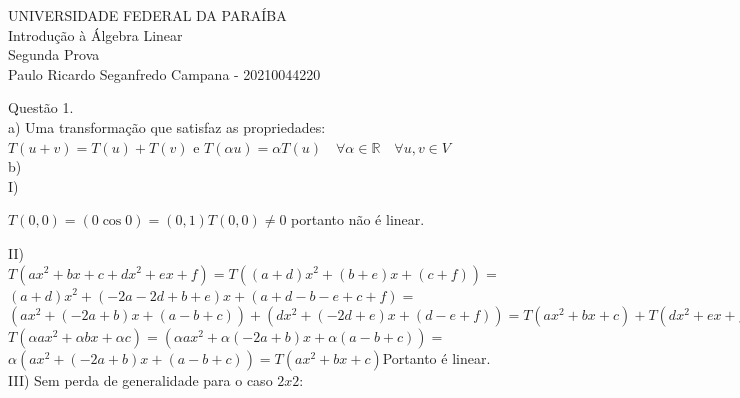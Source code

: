 \documentclass[12pt]{article}
\begin{document}
\begin{center}
	UNIVERSIDADE FEDERAL DA PARAÍBA\\
	Introdução à Álgebra Linear\\
	Segunda Prova\\
	Paulo Ricardo Seganfredo Campana - 20210044220\\
\end{center}

\noindent Questão 1.\\

\noindent a) Uma transformação que satisfaz as propriedades:\\

$T(u+v)=T(u)+T(v)$ e $T(\alpha u)=\alpha T(u)\quad\forall\alpha\in\mathds{R}\quad\forall u,v\in V$\\

\noindent b)\\
\noindent I) 

$T(0,0)=(0\cos0)=(0,1)$\hfill $T(0,0)\neq0$ portanto não é linear.

\noindent II)\\

$T(ax^{2}+bx+c+dx^{2}+ex+f)=T((a+d)x^{2}+(b+e)x+(c+f))=$\\

$(a+d)x^{2}+(-2a-2d+b+e)x+(a+d-b-e+c+f)=$\\

$(ax^{2}+(-2a+b)x+(a-b+c))+(dx^{2}+(-2d+e)x+(d-e+f))=T(ax^{2}+bx+c)+T(dx^{2}+ex+f)$\\

$T(\alpha ax^{2}+\alpha bx+\alpha c)=(\alpha ax^{2}+\alpha(-2a+b)x+\alpha(a-b+c))=$\\

$\alpha(ax^{2}+(-2a+b)x+(a-b+c))=T(ax^{2}+bx+c)$\hfill Portanto é linear.\\

\noindent III) Sem perda de generalidade para o caso $2x2$:\\
\end{document}
